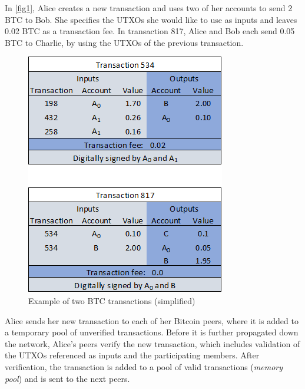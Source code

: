 \documentclass[a4paper,12pt,twoside]{report}
\begin{document}
In \autoref{fig1}, Alice creates a new transaction and uses two of her accounts to send 2 BTC to Bob. She specifies the UTXOs she would like to use as inputs and leaves 0.02 BTC as a transaction fee. In transaction 817, Alice and Bob each send 0.05 BTC to Charlie, by using the UTXOs of the previous transaction. \cite{DSAwithTime}
\begin{figure}[ht]
	\centering
  \includegraphics[scale=0.7]{TransactionExample.png}
	\caption{Example of two BTC transactions (simplified) \cite{DSAwithTime}}
	\label{fig1}
\end{figure}

Alice sends her new transaction to each of her Bitcoin peers, where it is added to a temporary pool of unverified transactions. Before it is further propagated down the network, Alice's peers verify the new transaction, which includes validation of the UTXOs referenced as inputs and the participating members. After verification, the transaction is added to a pool of valid transactions (\textit{memory pool}) and is sent to the next peers. \cite{antonopoulos2017mastering}
\end{document}
